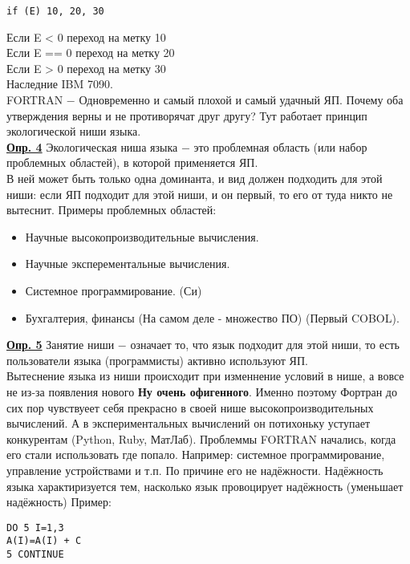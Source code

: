 \documentclass[a4paper, 12pt, titlepage, finall]{extreport}
\begin{document}
\begin{lstlisting}
if (E) 10, 20, 30
\end{lstlisting}
             Если E < 0 переход на метку 10\\
             Если E == 0 переход на метку 20\\
             Если E > 0 переход на метку 30\\
             Наследние IBM 7090.\\
             FORTRAN $-$ Одновременно и самый плохой и самый удачный ЯП. Почему оба утверждения верны и не противорячат друг другу?
             Тут работает принцип экологической ниши языка.\\
             \underline{\bf Опр. 4} Экологическая ниша языка $-$ это проблемная область (или набор проблемных областей), в которой применяется ЯП.\\
             В ней может быть только одна доминанта, и вид должен подходить для этой ниши: если ЯП подходит для этой ниши, и он первый, то его от туда никто не вытеснит.
             Примеры проблемных областей:
             \begin{itemize}
                \item Научные высокопроизводительные вычисления.
                \item Научные эксперементальные вычисления.
                \item Системное программирование. (Си)
                \item Бухгалтерия, финансы (На самом деле - множество ПО) (Первый COBOL).
            \end{itemize}

            \underline{\bf Опр. 5} Занятие ниши $-$ означает то, что язык подходит для этой ниши, то есть пользователи языка (программисты) активно используют ЯП.\\
            Вытеснение языка из ниши происходит при изменнение условий в нише, а вовсе не из-за появления нового {\bf Ну очень офигенного}. 
            Именно поэтому Фортран до сих пор чувствуеет себя прекрасно в своей нише высокопроизводительных вычислений.
            А в экспериментальных вычислений он потихоньку уступает конкурентам (Python, Ruby, МатЛаб).
            Проблеммы FORTRAN начались, когда его стали использовать где попало. Например: системное программирование, управление устройствами и т.п.
            По причине его не надёжности.
            Надёжность языка характиризуется тем, насколько язык провоцирует надёжность (уменьшает надёжность)
            Пример:
\begin{lstlisting}
DO 5 I=1,3
A(I)=A(I) + C
5 CONTINUE
\end{lstlisting}
            
\end{document}
